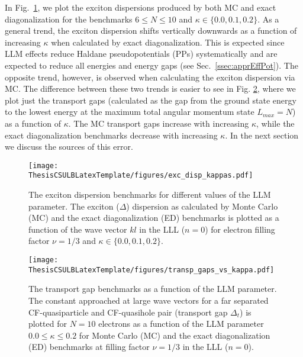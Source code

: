     In Fig.~\ref{fig:exc_disp_kappas}, we plot the exciton dispersions produced by both MC and exact diagonalization for the benchmarks $6\leq N\leq10$ and $\kappa\in\{0.0,0.1,0.2\}$. As a general trend, the exciton dispersion shifts vertically downwards as a function of increasing $\kappa$ when calculated by exact diagonalization. This is expected since LLM effects reduce Haldane pseudopotentials (PPs) systematically and are expected to reduce all energies and energy gaps (see Sec.~\ref{ssec:apprEffPot}). The opposite trend, however, is observed when calculating the exciton dispersion via MC. The difference between these two trends is easier to see in Fig. \ref{fig:transp_gaps_vs_kappa}, where we plot just the transport gaps (calculated as the gap from the ground state energy to the lowest energy at the maximum total angular momentum state $L_{max}=N$) as a function of $\kappa$. The MC transport gaps increase with increasing $\kappa$, while the exact diagonalization benchmarks decrease with increasing $\kappa$. In the next section we discuss the sources of this error.
    
    \begin{figure}[H]
    \begin{center}
    \texttt{[image: ThesisCSULBLatexTemplate/figures/exc\_disp\_kappas.pdf]}
    \caption[The exciton dispersion benchmarks for different values of the LLM parameter.]{The exciton dispersion benchmarks for different values of the LLM parameter. The exciton ($\Delta$) dispersion as calculated by Monte Carlo (MC) and the exact diagonalization (ED) benchmarks is plotted as a function of the wave vector $kl$ in the LLL ($n=0$) for electron filling factor $\nu=1/3$ and $\kappa\in\{0.0,0.1,0.2\}$.}
    \label{fig:exc_disp_kappas} 
    \end{center}
    \end{figure}
    
    \begin{figure}[H]
    \begin{center}
    \texttt{[image: ThesisCSULBLatexTemplate/figures/transp\_gaps\_vs\_kappa.pdf]}
    \caption[The transport gap benchmarks as a function of the LLM parameter.]{The transport gap benchmarks as a function of the LLM parameter. The constant approached at large wave vectors for a far separated CF-quasiparticle and CF-quasihole pair (transport gap $\Delta_t$) is plotted for $N=10$ electrons as a function of the LLM parameter $0.0\leq\kappa\leq0.2$ for Monte Carlo (MC) and the exact diagonalization (ED) benchmarks at filling factor $\nu=1/3$ in the LLL ($n=0$).}
    \label{fig:transp_gaps_vs_kappa}
    \end{center}
    \end{figure}
    
